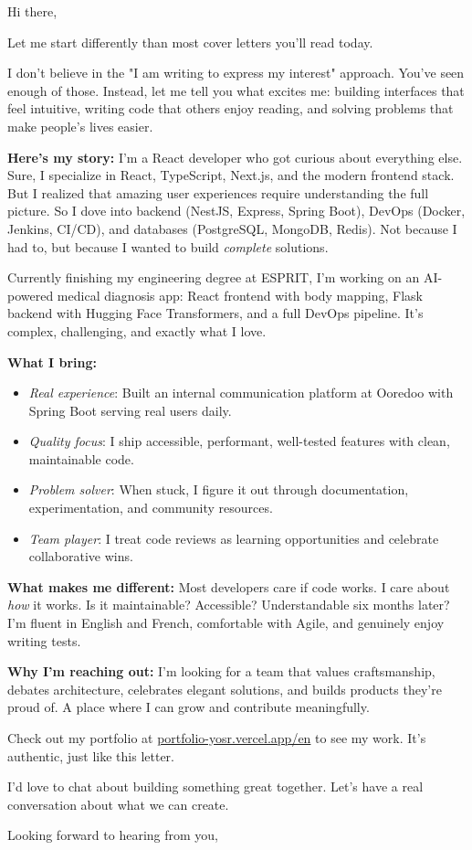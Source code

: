 \documentclass[10pt,a4paper]{letter}
\begin{document}
\begin{letter}{}

\opening{Hi there,}

Let me start differently than most cover letters you'll read today.

I don't believe in the "I am writing to express my interest" approach. You've seen enough of those. Instead, let me tell you what excites me: building interfaces that feel intuitive, writing code that others enjoy reading, and solving problems that make people's lives easier.

\textbf{Here's my story:} I'm a React developer who got curious about everything else. Sure, I specialize in React, TypeScript, Next.js, and the modern frontend stack. But I realized that amazing user experiences require understanding the full picture. So I dove into backend (NestJS, Express, Spring Boot), DevOps (Docker, Jenkins, CI/CD), and databases (PostgreSQL, MongoDB, Redis). Not because I had to, but because I wanted to build \textit{complete} solutions.

Currently finishing my engineering degree at ESPRIT, I'm working on an AI-powered medical diagnosis app: React frontend with body mapping, Flask backend with Hugging Face Transformers, and a full DevOps pipeline. It's complex, challenging, and exactly what I love.

\textbf{What I bring:}

\begin{itemize}[leftmargin=1em, topsep=0.2em, itemsep=0.2em, parsep=0pt]
    \item \textit{Real experience}: Built an internal communication platform at Ooredoo with Spring Boot serving real users daily.
    \item \textit{Quality focus}: I ship accessible, performant, well-tested features with clean, maintainable code.
    \item \textit{Problem solver}: When stuck, I figure it out through documentation, experimentation, and community resources.
    \item \textit{Team player}: I treat code reviews as learning opportunities and celebrate collaborative wins.
\end{itemize}

\textbf{What makes me different:} Most developers care if code works. I care about \textit{how} it works. Is it maintainable? Accessible? Understandable six months later? I'm fluent in English and French, comfortable with Agile, and genuinely enjoy writing tests.

\textbf{Why I'm reaching out:} I'm looking for a team that values craftsmanship, debates architecture, celebrates elegant solutions, and builds products they're proud of. A place where I can grow and contribute meaningfully.

Check out my portfolio at \href{https://portfolio-yosr.vercel.app/en}{portfolio-yosr.vercel.app/en} to see my work. It's authentic, just like this letter.

I'd love to chat about building something great together. Let's have a real conversation about what we can create.

\closing{Looking forward to hearing from you,}

\end{letter}
\end{document}
